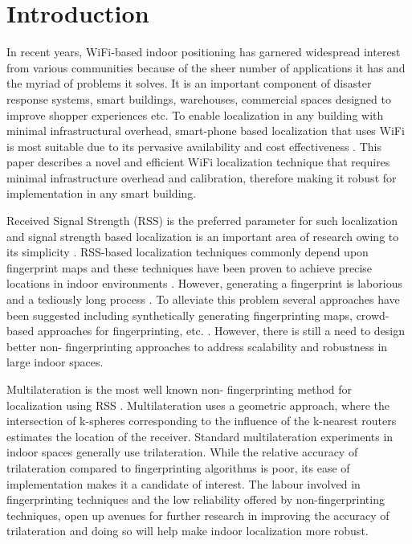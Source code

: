 \documentclass[twocolumn]{svjour3}
\begin{document}
\section{\textbf{Introduction}}
In recent years, WiFi-based indoor positioning has garnered widespread interest from various communities because of the sheer number of applications it has and the myriad of problems it solves. It is an important component of disaster response systems, smart buildings, warehouses, commercial spaces designed to improve shopper experiences etc. To enable localization in any building with minimal infrastructural overhead, smart-phone based localization that uses WiFi is most suitable due to its pervasive availability and cost effectiveness \citep*{4796924}. This paper describes a novel and efficient WiFi localization technique that requires minimal infrastructure overhead and calibration, therefore making it robust for implementation in any smart building. 

Received Signal Strength (RSS) is the preferred parameter for such localization and signal strength based localization is an important area of research owing to its simplicity \citep*{RSSI_Analysis, Analysis_RSSI}. RSS-based localization techniques commonly depend upon fingerprint maps and these techniques have been proven to achieve precise locations in indoor environments \citep*{kaemarungsi2012analysis, zhang15, 4796924, Hossain20151}. However, generating a fingerprint is laborious and a tediously long process \citep*{ekahau, 4343996,4796924}. To alleviate this problem several approaches have been suggested including synthetically generating fingerprinting maps, crowd-based approaches for fingerprinting, etc. \citep*{4796924}. However, there is still a need to design better non- fingerprinting approaches to address scalability and robustness in large indoor spaces.

Multilateration is the most well known non- fingerprinting method for localization using RSS \citep*{yang2009indoor}. Multilateration uses a geometric approach, where the intersection of k-spheres corresponding to the influence of the k-nearest routers estimates the location of the receiver. Standard multilateration experiments in indoor spaces generally use trilateration. While the relative accuracy of trilateration compared to fingerprinting algorithms is poor, its ease of implementation makes it a candidate of interest. The labour involved in fingerprinting techniques and the low reliability offered by non-fingerprinting techniques, open up avenues for further research in improving the accuracy of trilateration and doing so will help make indoor localization more robust. 
\end{document}
